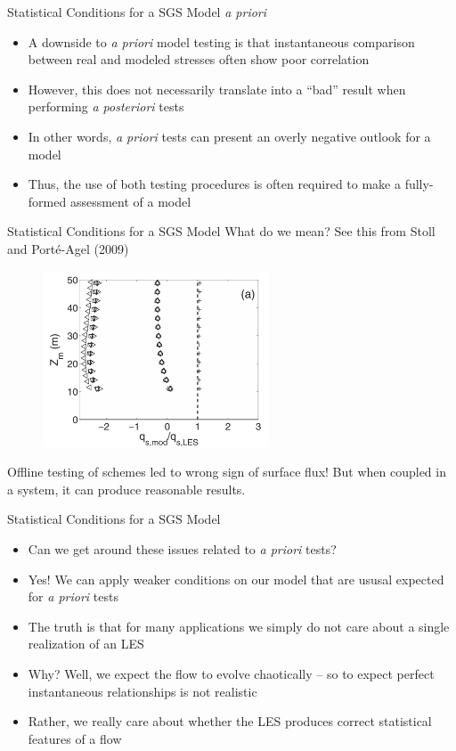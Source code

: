 \begin{frame}{Statistical Conditions for a SGS Model}
\textit{a priori}
\begin{itemize}
	\item A downside to \textit{a priori} model testing is that instantaneous comparison between real and modeled stresses often show poor correlation
	\item However, this does not necessarily translate into a ``bad'' result when performing \textit{a posteriori} tests
	\item In other words, \textit{a priori} tests can present an overly negative outlook for a model
	\item Thus, the use of both testing procedures is often required to make a fully-formed assessment of a model
\end{itemize}
\end{frame}
\begin{frame}{Statistical Conditions for a SGS Model}
What do we mean? See this from Stoll and Port\'{e}-Agel (2009)
\begin{figure}
	\includegraphics[width=0.6\textwidth]{apriori1}	
\end{figure}
Offline testing of schemes led to wrong sign of surface flux! But when coupled in a system, it can produce reasonable results.
\end{frame}
\begin{frame}{Statistical Conditions for a SGS Model}
\begin{itemize}
	\item Can we get around these issues related to \textit{a priori} tests?
	\item Yes! We can apply weaker conditions on our model that are ususal expected for \textit{a priori} tests
	\item The truth is that for many applications we simply do not care about a single realization of an LES
	\item Why? Well, we expect the flow to evolve chaotically -- so to expect perfect instantaneous relationships is not realistic
	\item Rather, we really care about whether the LES produces correct statistical features of a flow
\end{itemize}
\end{frame}
